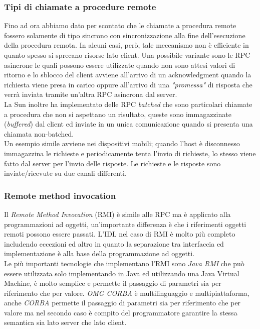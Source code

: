 \subsubsection{Tipi di chiamate a procedure remote}
Fino ad ora abbiamo dato per scontato che le chiamate a procedura remote fossero solamente di tipo sincrono con sincronizzazione alla fine dell'esecuzione della procedura remota. In alcuni casi, però, tale meccanismo non è efficiente in quanto spesso si sprecano risorse lato client. Una possibile variante sono le RPC asincrone le quali possono essere utilizzate quando non sono attesi valori di ritorno e lo sblocco del client avviene all'arrivo di un acknowledgment quando la richiesta viene presa in carico oppure all'arrivo di una \emph{"promessa"} di risposta che verrà inviata tramite un'altra RPC asincrona dal server.\\
La Sun inoltre ha implementato delle RPC \emph{batched} che sono particolari chiamate a procedura che non si aspettano un risultato, queste sono immagazzinate (\emph{buffered}) dal client ed inviate in un unica comunicazione quando si presenta una chiamata non-batched.\\
Un esempio simile avviene nei dispositivi mobili; quando l'host è disconnesso immagazzina le richieste e periodicamente tenta l'invio di richieste, lo stesso viene fatto dal server per l'invio delle risposte. Le richieste e le risposte sono inviate/ricevute su due canali differenti.\\
\subsubsection{Remote method invocation}
Il \emph{Remote Method Invocation} (RMI) è simile alle RPC ma è applicato alla programmazioni ad oggetti, un'importante differenza è che i riferimenti oggetti remoti possono essere passati. L'IDL nel caso di RMI è molto più completo includendo eccezioni ed altro in quanto la separazione tra interfaccia ed implementazione è alla base della programmazione ad oggetti.\\
Le più importanti tecnologie che implementano l'RMI sono \emph{Java RMI} che può essere utilizzata solo implementando in Java ed utilizzando una Java Virtual Machine, è molto semplice e permette il passaggio di parametri sia per riferimento che per valore. \emph{OMG CORBA} è multilinguaggio e multipiattaforma, anche \emph{CORBA} permette il passaggio di parametri sia per riferimento che per valore ma nel secondo caso è compito del programmatore garantire la stessa semantica sia lato server che lato client.
